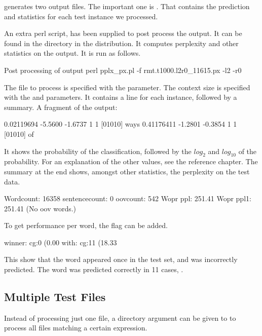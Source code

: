 \documentclass[a4paper,10pt,twoside]{report}
\begin{document}
\Wopr{} generates two output files. The important one is
. That contains the prediction and
statistics for each test instance we processed.

An extra perl script,  has been supplied to post
process the output. It can be found in the  directory in the
\wopr{} distribution. It computes perplexity and other statistics on
the output. It is run as follows.

\begin{bash}{Post processing of \wopr{} output}
perl pplx_px.pl -f rmt.t1000.l2r0_11615.px -l2 -r0
\end{bash}

The file to process is specified with the  parameter. The
context size is specified with the  and 
parameters. It contains a line for each instance, followed by a
summary. A fragment of the output:

\begin{wout}{}
0.02119694  -5.5600  -1.6737  1 1 [01010] ways
0.41176411  -1.2801  -0.3854  1 1 [01010] of
\end{wout}

It shows the probability of the classification, followed by the
$log_2$ and $log_{10}$ of the probability. For an explanation of the
other values, see the reference chapter. The summary at the end shows,
amongst other statistics, the perplexity on the test data.

\begin{wout}{}
Wordcount: 16358 sentencecount: 0 oovcount: 542
Wopr ppl:    251.41 Wopr ppl1:    251.41  (No oov words.)
\end{wout}

To get performance per word, the  flag can be added.

\begin{wout}{}
winner: cg:0 (0.00%
with: cg:11 (18.33%
\end{wout}

This show that the word  appeared once in the test set,
and was incorrectly predicted. The word  was predicted
correctly in \num{11} cases, \etc{}.

\subsection{Multiple Test Files}

Instead of processing just one file, a directory argument can be given
to \wopr{} to process all files matching a certain expression.
\end{document}
